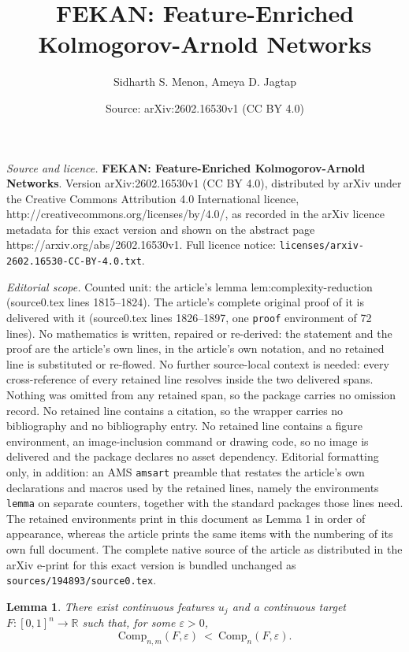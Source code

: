 \documentclass[10pt,a4paper]{amsart}
\title{\textbf{FEKAN: Feature-Enriched Kolmogorov-Arnold Networks}}
\author{Sidharth S. Menon, Ameya D. Jagtap}
\date{Source: arXiv:2602.16530v1 (CC BY 4.0)}
\newtheorem{lemma}{Lemma}
\begin{document}
\maketitle

\noindent\emph{Source and licence.} \textbf{FEKAN: Feature-Enriched Kolmogorov-Arnold Networks}. Version arXiv:2602.16530v1 (CC BY 4.0), distributed by arXiv under the Creative Commons Attribution 4.0 International licence, http://creativecommons.org/licenses/by/4.0/, as recorded in the arXiv licence metadata for this exact version and shown on the abstract page https://arxiv.org/abs/2602.16530v1. Full licence notice: \texttt{licenses/arxiv-2602.16530-CC-BY-4.0.txt}.\par\smallskip

\noindent\textit{Editorial scope.} Counted unit: the article's lemma lem:complexity-reduction (source0.tex lines 1815--1824). The article's complete original proof of it is delivered with it (source0.tex lines 1826--1897, one \texttt{proof} environment of 72 lines). No mathematics is written, repaired or re-derived: the statement and the proof are the article's own lines, in the article's own notation, and no retained line is substituted or re-flowed.  No further source-local context is needed: every cross-reference of every retained line resolves inside the two delivered spans.  Nothing was omitted from any retained span, so the package carries no omission record.  No retained line contains a citation, so the wrapper carries no bibliography and no bibliography entry.  No retained line contains a figure environment, an image-inclusion command or drawing code, so no image is delivered and the package declares no asset dependency.  Editorial formatting only, in addition: an AMS \texttt{amsart} preamble that restates the article's own declarations and macros used by the retained lines, namely the environments \texttt{lemma} on separate counters, together with the standard packages those lines need.  The retained environments print in this document as Lemma 1 in order of appearance, whereas the article prints the same items with the numbering of its own full document.  The complete native source of the article as distributed in the arXiv e-print for this exact version is bundled unchanged as \texttt{sources/194893/source0.tex}.
\begin{lemma}
\label{lem:complexity-reduction}
There exist continuous features \(u_j\) and a continuous target 
\(F:[0,1]^n \to \mathbb{R}\) such that, for some \(\varepsilon>0\),
\[
\mathrm{Comp}_{n,m}(F,\varepsilon)
\ <\
\mathrm{Comp}_{n}(F,\varepsilon).
\]
\end{lemma}
\end{document}
